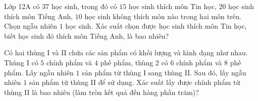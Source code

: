 \begin{bt}%
	Lớp 12A có $37$ học sinh, trong đó có $15$ học sinh thích môn Tin học, $20$ học sinh thích môn Tiếng Anh, $10$ học sinh không thích môn nào trong hai môn trên. Chọn ngẫu nhiên $1$ học sinh. Xác suất chọn được học sinh thích môn Tin học, biết học sinh đó  thích môn Tiếng Anh, là bao nhiêu?
\end{bt}

\begin{bt}%
	Có hai thùng I và II chứa các sản phẩm có khối lượng và hình dạng như nhau. Thùng I có $5$ chính phẩm và $4$ phế phẩm, thùng $2$ có $6$ chính phẩm và $8$ phế phẩm. Lấy ngẫu nhiên $1$ sản phẩm từ thùng I sang thùng II. Sau đó, lấy ngẫu nhiên $1$ sản phẩm từ thùng II để sử dụng. Xác  suất lấy được chính phẩm từ thùng II là bao nhiêu (làm tròn kết quả đến hàng phần trăm)?
\end{bt}

